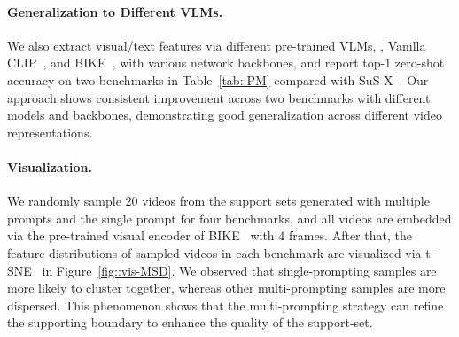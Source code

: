
\paragraph{Generalization to Different VLMs.}
{
    We also extract visual/text features via different pre-trained VLMs, \ie, Vanilla CLIP~\cite{radford2021learning}, and BIKE~\cite{wu2023bidirectional}, 
    with various network backbones,
    and report top-1 zero-shot accuracy on two benchmarks in Table~\ref{tab::PM} compared with SuS-X~\cite{udandarao2022sus-x}. Our approach shows consistent improvement across two benchmarks with different models and backbones, demonstrating good generalization across different video representations.   
}


\paragraph{Visualization.}
{
    We randomly sample $20$ videos from the support sets generated with multiple prompts and the single prompt for four benchmarks, and all videos are embedded via the pre-trained visual encoder of BIKE~\cite{wu2023bidirectional} with $4$ frames. After that, the feature distributions of sampled videos in each benchmark are visualized via t-SNE~\cite{van2008visualizing} in Figure~\ref{fig::vis-MSD}. We observed that single-prompting samples are more likely to cluster together, whereas other multi-prompting samples are more dispersed. This phenomenon shows that the multi-prompting strategy can refine the supporting boundary to enhance the quality of the support-set.
    

}